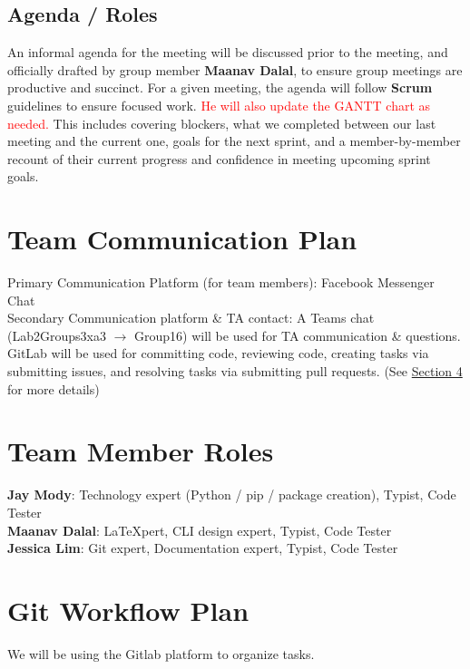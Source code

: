 \documentclass{article}
\begin{document}
\subsection*{Agenda / Roles}
An informal agenda for the meeting will be discussed prior to the meeting, and officially drafted by group member \textbf{Maanav Dalal}, to ensure group meetings are productive and succinct. For a given meeting, the agenda will follow \textbf{Scrum} guidelines to ensure focused work. \textcolor{red}{He will also update the GANTT chart as needed.} This includes covering blockers, what we completed between our last meeting and the current one, goals for the next sprint, and a member-by-member recount of their current progress and confidence in meeting upcoming sprint goals.

\section{Team Communication Plan}
\noindent Primary Communication Platform (for team members): Facebook Messenger Chat \\

\noindent Secondary Communication platform \& TA contact: A Teams chat (Lab2Groups3xa3 $\rightarrow$ Group16) will be used for TA communication \& questions. \\

\noindent GitLab will be used for committing code, reviewing code, creating tasks via submitting issues, and resolving tasks via submitting pull requests. (See \hyperref[sec:git]{Section 4} for more details)

\section{Team Member Roles}

\noindent \textbf{Jay Mody}: Technology expert (Python / pip / package creation), Typist, Code Tester \\
\textbf{Maanav Dalal}: LaTeXpert, CLI design expert, Typist, Code Tester \\
\textbf{Jessica Lim}: Git expert, Documentation expert, Typist, Code Tester

\section{Git Workflow Plan}
\label{sec:git}
We will be using the Gitlab platform to organize tasks.
\end{document}
